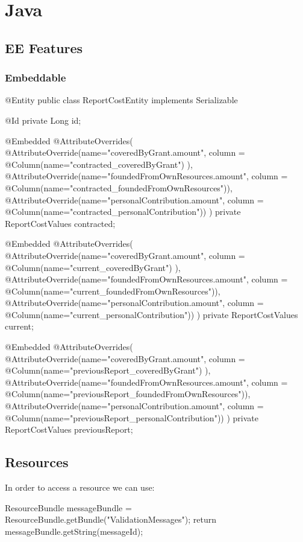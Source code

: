 \section{Java}
\subsection{EE Features}
\subsubsection{Embeddable}
\begin{javacode}[Embeddable]
	@Entity 
	public class ReportCostEntity implements  Serializable {
		
		@Id
		private Long id;
		
		@Embedded   
		@AttributeOverrides( {
			@AttributeOverride(name="coveredByGrant.amount", column = @Column(name="contracted_coveredByGrant") ),
			@AttributeOverride(name="foundedFromOwnResources.amount", column = @Column(name="contracted_foundedFromOwnResources")),
			@AttributeOverride(name="personalContribution.amount", column = @Column(name="contracted_personalContribution"))
		} )
		private ReportCostValues contracted;
		
		@Embedded
		@AttributeOverrides( {
			@AttributeOverride(name="coveredByGrant.amount", column = @Column(name="current_coveredByGrant") ),
			@AttributeOverride(name="foundedFromOwnResources.amount", column = @Column(name="current_foundedFromOwnResources")),
			@AttributeOverride(name="personalContribution.amount", column = @Column(name="current_personalContribution"))
		} )
		private ReportCostValues current;
		
		@Embedded 
		@AttributeOverrides( {
			@AttributeOverride(name="coveredByGrant.amount", column = @Column(name="previousReport_coveredByGrant") ),
			@AttributeOverride(name="foundedFromOwnResources.amount", column = @Column(name="previousReport_foundedFromOwnResources")),
			@AttributeOverride(name="personalContribution.amount", column = @Column(name="previousReport_personalContribution"))
		} )
		private ReportCostValues previousReport;
	} 
\end{javacode}
	

\subsection{Resources}
In order to access a resource we can use:

\begin{javacode}
    ResourceBundle messageBundle = ResourceBundle.getBundle("ValidationMessages");
    return messageBundle.getString(messageId);
\end{javacode}

